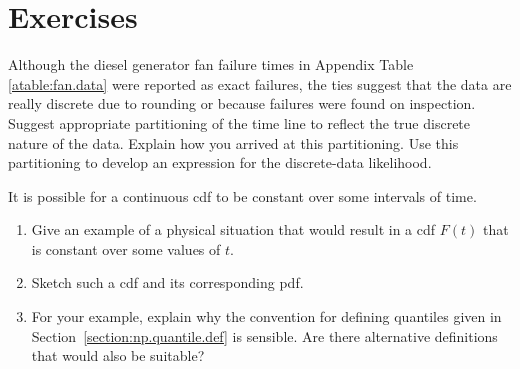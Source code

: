 \section*{Exercises}

\begin{exercise}
Although the diesel generator fan failure times in Appendix Table
\ref{atable:fan.data} were reported as exact failures, the ties
suggest that the data are really discrete due to rounding or because
failures were found on inspection. Suggest appropriate partitioning of the
time line to reflect the true discrete nature of the data. Explain how
you arrived at this partitioning.  Use this partitioning to develop an
expression for the discrete-data likelihood.
\end{exercise}

\begin{exercise}
It is possible for a continuous cdf to be constant over some
intervals of time.
\begin{enumerate}
\item
Give an example of a physical situation that would result in a cdf
$F(t)$ that is constant over some values of $t$.
\item 
Sketch such a
cdf and its corresponding pdf.  
\item 
For your example, explain why the
convention for defining quantiles given in
Section~\ref{section:np.quantile.def} is sensible.  Are there
alternative definitions that would also be suitable?
\end{enumerate}
\end{exercise}


